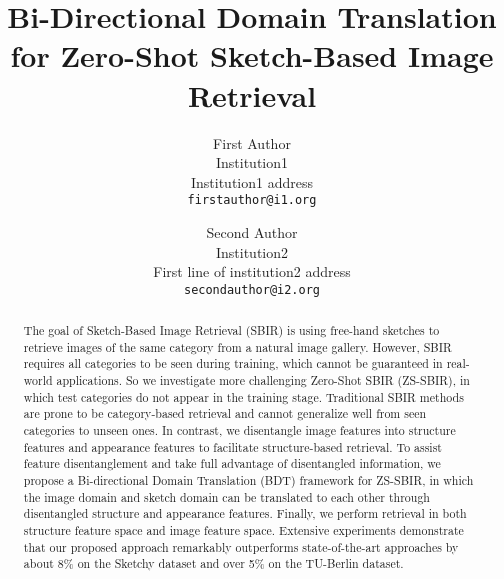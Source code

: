 \documentclass[10pt,twocolumn,letterpaper]{article}
\begin{document}
\title{Bi-Directional Domain Translation for Zero-Shot Sketch-Based Image Retrieval}

\author{First Author\\
Institution1\\
Institution1 address\\
{\tt\small firstauthor@i1.org}
\and
Second Author\\
Institution2\\
First line of institution2 address\\
{\tt\small secondauthor@i2.org}
}

\maketitle

\maketitle

\begin{abstract}
   The goal of Sketch-Based Image Retrieval (SBIR) is using free-hand sketches to retrieve images of the same category from a natural image gallery. 
   However, SBIR requires all categories to be seen during training, which cannot be guaranteed in real-world applications. 
   So we investigate more challenging Zero-Shot SBIR (ZS-SBIR), in which test categories do not appear in the training stage. 
   Traditional SBIR methods are prone to be category-based retrieval and cannot generalize well from seen categories to unseen ones. 
   In contrast, we disentangle image features into structure features and appearance features to facilitate structure-based retrieval.
   To assist feature disentanglement and take full advantage of disentangled information, we propose a Bi-directional Domain Translation (BDT) framework for ZS-SBIR, in which the image domain and sketch domain can be translated to each other through disentangled structure and appearance features.
   Finally, we perform retrieval in both structure feature space and image feature space. 
   Extensive experiments demonstrate that our proposed approach remarkably outperforms state-of-the-art approaches by about 8\% on the Sketchy dataset and over 5\% on the TU-Berlin dataset.
\end{abstract}
\end{document}
